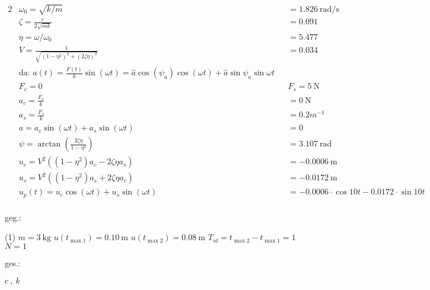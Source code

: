 \begin{questions}
    \begin{solution}
        \begin{alignat*}{2}
            &\omega_0 = \sqrt{k/m} &&= \SI{1.826}{\radian\per\second} \\
            &\zeta = \frac{c}{2\sqrt{mk}} &&= 0.091 \\
            &\eta = \omega/\omega_0 &&= 5.477\\
            &V = \frac{1}{\sqrt{(1 - \eta^2)^2 + (2\zeta\eta)^2}} &&= 0.034\\
            &\text{da: } a(t) = \frac{F(t)}{k} \sin(\omega t) = \hat{a} \cos(\psi_a) \cos(\omega t) + \hat{a} \sin{\psi_a} \sin{\omega t} \\
            &F_c = 0 && F_s = \SI{5}{\newton} \\
            &a_c = \frac{F_c}{k} &&= \SI{0}{\newton}\\ 
            &a_s = \frac{F_s}{k} &&= 0.2 m^{-1} \\
            &a= a_c \sin(\omega t) + a_s \sin(\omega t) &&= 0 \\
            &\psi = \arctan(\frac{2\zeta \eta}{1-\eta^2}) &&= \SI{3.107}{\radian}\\
            &u_c = V^2((1-\eta^2)a_c - 2 \zeta \eta a_s) &&= \SI{-0.0006}{\meter}\\
            &u_s = V^2((1 - \eta^2)a_s + 2 \zeta \eta a_c) &&= \SI{-0.0172}{\meter}\\
            &u_p(t)= u_c \cos(\omega t) + u_s \sin(\omega t) &&= -0.0006 \cdot \cos{10t} - 0.0172 \cdot \sin{10t}\\
        \end{alignat*}
    \end{solution}
        
%


    

    \begin{minipage}[t]{.49\linewidth}
        geg.:
        \begin{tasks} (1)
           \task[] $m = \SI{3}{\kilo\gram}$
           \task[] $u(t_{\max1}) = \SI{0.10}{\meter}$
           \task[] $u(t_{\max2}) = \SI{0.08}{\meter}$
           \task[] $T_{id} = t_{\max2}-t_{\max1} = 1$
           \task[] $N = 1$
        \end{tasks}
        \end{minipage}
        \begin{minipage}[t]{.49\linewidth}
        ges.:
        \begin{tasks}
            \task$c ~,~ k$
        \end{tasks}
    \end{minipage}\\
    \vspace{1cm}


\end{questions}
